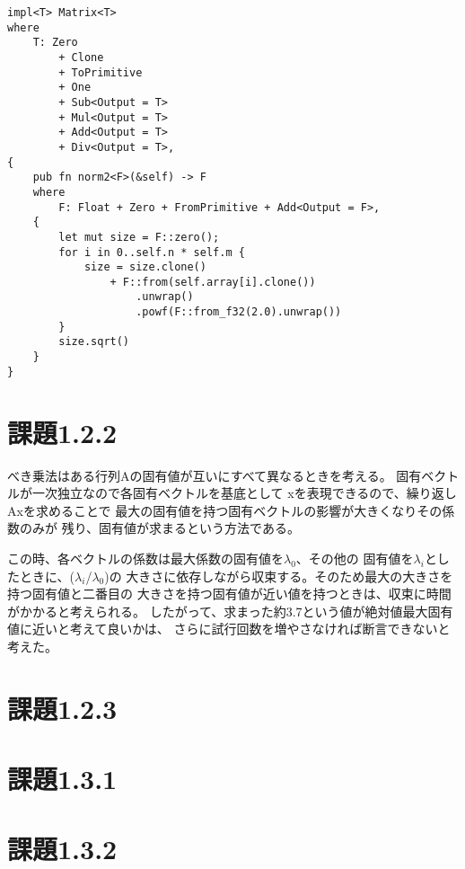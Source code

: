 \documentclass[uplatex, 11pt,a4j, titlepage]{jsarticle}
\begin{document}
\begin{lstlisting}[caption={matrix\_dash.rs}]
impl<T> Matrix<T>
where
    T: Zero
        + Clone
        + ToPrimitive
        + One
        + Sub<Output = T>
        + Mul<Output = T>
        + Add<Output = T>
        + Div<Output = T>,
{
    pub fn norm2<F>(&self) -> F
    where
        F: Float + Zero + FromPrimitive + Add<Output = F>,
    {
        let mut size = F::zero();
        for i in 0..self.n * self.m {
            size = size.clone()
                + F::from(self.array[i].clone())
                    .unwrap()
                    .powf(F::from_f32(2.0).unwrap())
        }
        size.sqrt()
    }
}

\end{lstlisting}

\newpage

\section{課題1.2.2}

べき乗法はある行列Aの固有値が互いにすべて異なるときを考える。
固有ベクトルが一次独立なので各固有ベクトルを基底として
xを表現できるので、繰り返しAxを求めることで
最大の固有値を持つ固有ベクトルの影響が大きくなりその係数のみが
残り、固有値が求まるという方法である。

この時、各ベクトルの係数は最大係数の固有値を$\lambda_{0}$、その他の
固有値を$\lambda_{i}$としたときに、($\lambda_i$/$\lambda_0$)の
大きさに依存しながら収束する。そのため最大の大きさを持つ固有値と二番目の
大きさを持つ固有値が近い値を持つときは、収束に時間がかかると考えられる。
したがって、求まった約3.7という値が絶対値最大固有値に近いと考えて良いかは、
さらに試行回数を増やさなければ断言できないと考えた。


\section{課題1.2.3}

\newpage



\subtitle{2019/*/*}

\section{課題1.3.1}
\section{課題1.3.2}


\newpage
\thispagestyle{empty}
\nocite{key1}
\nocite{key2}


\end{document}
